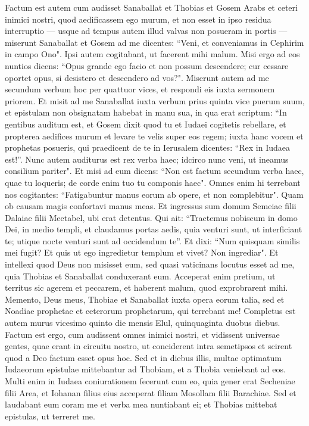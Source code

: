\begin{biblechapter}  
\verse Factum est autem cum audisset Sanaballat et Thobias et Gosem Arabs et ceteri inimici nostri, quod aedificassem ego murum, et non esset in ipso residua interruptio — usque ad tempus autem illud valvas non posueram in portis — 
\verse miserunt Sanaballat et Gosem ad me dicentes: “Veni, et conveniamus in Cephirim in campo Ono". Ipsi autem cogitabant, ut facerent mihi malum. 
\verse Misi ergo ad eos nuntios dicens: “Opus grande ego facio et non possum descendere; cur cessare oportet opus, si desistero et descendero ad vos?". 
\verse Miserunt autem ad me secundum verbum hoc per quattuor vices, et respondi eis iuxta sermonem priorem. 
\verse Et misit ad me Sanaballat iuxta verbum prius quinta vice puerum suum, et epistulam non obsignatam habebat in manu sua, in qua erat scriptum: 
\verse “In gentibus auditum est, et Gosem dixit quod tu et Iudaei cogitetis rebellare, et propterea aedifices murum et levare te velis super eos regem; iuxta hanc vocem  
\verse et prophetas posueris, qui praedicent de te in Ierusalem dicentes: “Rex in Iudaea est!”. Nunc autem auditurus est rex verba haec; idcirco nunc veni, ut ineamus consilium pariter". 
\verse Et misi ad eum dicens: “Non est factum secundum verba haec, quae tu loqueris; de corde enim tuo tu componis haec".  
\verse Omnes enim hi terrebant nos cogitantes: “Fatigabuntur manus eorum ab opere, et non complebitur". Quam ob causam magis confortavi manus meas. 
\verse Et ingressus sum domum Semeiae filii Dalaiae filii Meetabel, ubi erat detentus. Qui ait: “Tractemus nobiscum in domo Dei, in medio templi, et claudamus portas aedis, quia venturi sunt, ut interficiant te; utique nocte venturi sunt ad occidendum te”. 
\verse Et dixi: “Num quisquam similis mei fugit? Et quis ut ego ingredietur templum et vivet? Non ingrediar". 
\verse Et intellexi quod Deus non misisset eum, sed quasi vaticinans locutus esset ad me, quia Thobias et Sanaballat conduxerant eum. 
\verse Acceperat enim pretium, ut territus sic agerem et peccarem, et haberent malum, quod exprobrarent mihi. 
\verse Memento, Deus meus, Thobiae et Sanaballat iuxta opera eorum talia, sed et Noadiae prophetae et ceterorum prophetarum, qui terrebant me! 
\verse Completus est autem murus vicesimo quinto die mensis Elul, quinquaginta duobus diebus. 
\verse Factum est ergo, cum audissent omnes inimici nostri, et vidissent universae gentes, quae erant in circuitu nostro, ut conciderent intra semetipsos et scirent quod a Deo factum esset opus hoc. 
\verse Sed et in diebus illis, multae optimatum Iudaeorum epistulae mittebantur ad Thobiam, et a Thobia veniebant ad eos. 
\verse Multi enim in Iudaea coniurationem fecerunt cum eo, quia gener erat Secheniae filii Area, et Iohanan filius eius acceperat filiam Mosollam filii Barachiae. 
\verse Sed et laudabant eum coram me et verba mea nuntiabant ei; et Thobias mittebat epistulas, ut terreret me. 
\end{biblechapter}

